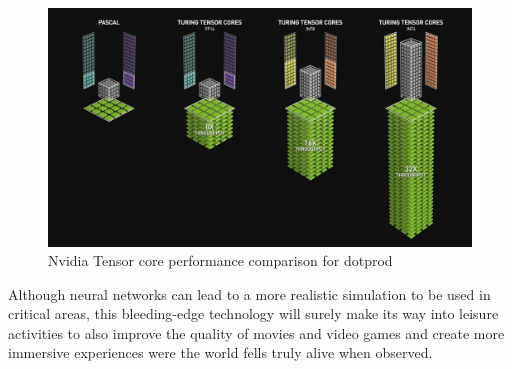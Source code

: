 \documentclass[sigconf]{acmart}
\begin{document}
\begin{figure}[h]
  \centering
  \includegraphics[width=\linewidth]{images/tensorcores.jpg}
  \caption{Nvidia Tensor core performance comparison for dotprod}
  \label{fig:tensorcore}
\end{figure}

Although neural networks can lead to a more realistic simulation to be used in critical areas,  this bleeding-edge
technology will surely make its way into leisure activities to also improve the quality of movies and video games
and create more immersive experiences were the world fells truly alive when observed.



\end{document}
